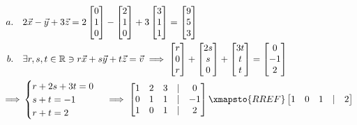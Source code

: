 \begin{align*}
    a. \quad & 2\vec{x} - \vec{y} + 3\vec{z} = 2\begin{bmatrix} 0 \\ 1 \\ 0 \end{bmatrix} - \begin{bmatrix} 2 \\ 1 \\ 0 \end{bmatrix} + 3\begin{bmatrix} 3 \\ 1 \\ 1 \end{bmatrix} = \begin{bmatrix}
        9 \\
        5 \\
        3
    \end{bmatrix} \\
    b. \quad & \exists r, s, t \in \mathbb{R} \ni r\vec{x} + s\vec{y} + t\vec{z} = \vec{v} \implies \begin{bmatrix} r \\ 0 \\ r \end{bmatrix} + \begin{bmatrix} 2s \\ s \\ 0 \end{bmatrix} + \begin{bmatrix} 3t \\ t \\ t \end{bmatrix} = \begin{bmatrix} 0 \\ -1 \\ 2 \end{bmatrix} \\
    \implies & \begin{cases}
        r + 2s + 3t = 0 \\
        s + t = -1 \\
        r + t = 2
    \end{cases} \implies \begin{bmatrix}
        1 & 2 & 3 & | & 0 \\
        0 & 1 & 1 & | & -1 \\
        1 & 0 & 1 & | & 2
    \end{bmatrix} \xmapsto{RREF} \begin{bmatrix}
        1 & 0 & 1 & | & 2 \\

\end{bmatrix}
\end{align*}
